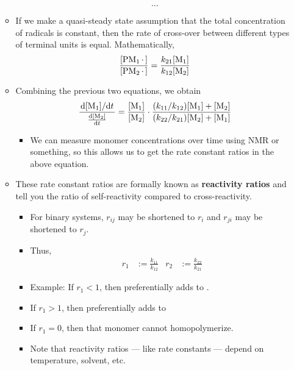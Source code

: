 \documentclass[../notes.tex]{subfiles}
\begin{document}
\begin{itemize}
\begin{itemize}
\begin{equation*}
            ...
        \end{equation*}
        \item If we make a quasi-steady state assumption that the total concentration of radicals is constant, then the rate of cross-over between different types of terminal units is equal. Mathematically,
        \begin{equation*}
            \frac{[\ce{PM_1*}]}{[\ce{PM_2*}]} = \frac{k_{21}[\ce{M_1}]}{k_{12}[\ce{M_2}]}
        \end{equation*}
        \item Combining the previous two equations, we obtain
        \begin{equation*}
            \frac{\dv*{[\ce{M1}]}{t}}{\dv{[\ce{M2}]}{t}} = \frac{[\ce{M1}]}{[\ce{M2}]}\cdot\frac{(k_{11}/k_{12})[\ce{M1}]+[\ce{M2}]}{(k_{22}/k_{21})[\ce{M2}]+[\ce{M1}]}
        \end{equation*}
        \begin{itemize}
            \item We can measure monomer concentrations over time using NMR or something, so this allows us to get the rate constant ratios in the above equation.
        \end{itemize}
        \item These rate constant ratios are formally known as \textbf{reactivity ratios} and tell you the ratio of self-reactivity compared to cross-reactivity.
        \begin{itemize}
            \item For binary systems, $r_{ij}$ may be shortened to $r_i$ and $r_{ji}$ may be shortened to $r_j$.
            \item Thus,
            \begin{align*}
                r_1 &:= \frac{k_{11}}{k_{12}}&
                r_2 &:= \frac{k_{22}}{k_{21}}
            \end{align*}
            \item Example: If $r_1<1$, then  preferentially adds to .
            \item If $r_1>1$, then  preferentially adds to 
            \item If $r_1=0$, then that monomer cannot homopolymerize.
            \item Note that reactivity ratios --- like rate constants --- depend on temperature, solvent, etc.
        \end{itemize}
    \end{itemize}

\end{itemize}
\end{document}
